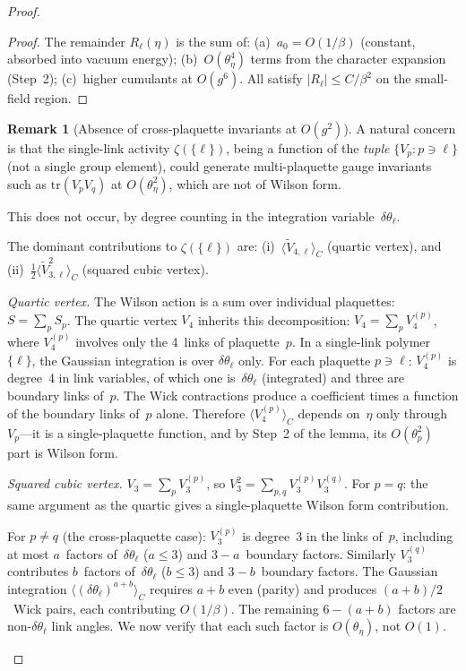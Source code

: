 \documentclass[11pt]{article}
\theoremstyle{definition}
\newtheorem{remark}[theorem]{Remark}
\newcommand{\tr}{\mathrm{tr}}
\begin{document}
\begin{proof}
\begin{proof}
The remainder $R_\ell(\eta)$ is the sum of:
(a)~$a_0=O(1/\beta)$ (constant, absorbed into vacuum energy);
(b)~$O(\theta_\eta^4)$ terms from the character expansion
(Step~2); (c)~higher cumulants at $O(g^6)$.  All satisfy
$|R_\ell|\le C/\beta^2$ on the small-field region.
\end{proof}

\begin{remark}[Absence of cross-plaquette invariants at $O(g^2)$]
\label{rem:cross-plaquette}
A natural concern is that the single-link activity
$\zeta(\{\ell\})$, being a function of the \emph{tuple}
$\{V_p:p\ni\ell\}$ (not a single group element), could
generate multi-plaquette gauge invariants such as
$\tr(V_p V_q)$ at $O(\theta_\eta^2)$, which are not of
Wilson form.

This does not occur, by degree counting in the
integration variable~$\delta\theta_\ell$.

The dominant contributions to $\zeta(\{\ell\})$ are:
(i)~$\langle\widetilde{V}_{4,\ell}\rangle_C$ (quartic
vertex), and
(ii)~$\frac{1}{2}\langle\widetilde{V}_{3,\ell}^2\rangle_C$
(squared cubic vertex).

\emph{Quartic vertex.}
The Wilson action is a sum over individual plaquettes:
$S=\sum_p S_p$.  The quartic vertex $V_4$ inherits this
decomposition: $V_4=\sum_p V_4^{(p)}$, where $V_4^{(p)}$
involves only the 4~links of plaquette~$p$.  In a
single-link polymer $\{\ell\}$, the Gaussian integration
is over $\delta\theta_\ell$ only.  For each plaquette
$p\ni\ell$: $V_4^{(p)}$ is degree~4 in link variables,
of which one is~$\delta\theta_\ell$ (integrated) and
three are boundary links of~$p$.  The Wick contractions
produce a coefficient times a function of the boundary
links of~$p$ alone.  Therefore
$\langle V_4^{(p)}\rangle_C$ depends on~$\eta$ only
through $V_p$---it is a single-plaquette function, and
by Step~2 of the lemma, its $O(\theta_p^2)$ part is
Wilson form.

\emph{Squared cubic vertex.}
$V_3=\sum_p V_3^{(p)}$, so
$V_3^2=\sum_{p,q}V_3^{(p)}V_3^{(q)}$.  For $p=q$:
the same argument as the quartic gives a single-plaquette
Wilson form contribution.

For $p\ne q$ (the cross-plaquette case):
$V_3^{(p)}$ is degree~3 in the links of~$p$, including
at most $a$~factors of~$\delta\theta_\ell$ ($a\le 3$)
and $3-a$~boundary factors.  Similarly $V_3^{(q)}$
contributes $b$~factors of~$\delta\theta_\ell$ ($b\le 3$)
and $3-b$~boundary factors.  The Gaussian integration
$\langle(\delta\theta_\ell)^{a+b}\rangle_C$ requires
$a+b$ even (parity) and produces $(a+b)/2$~Wick pairs,
each contributing $O(1/\beta)$.  The remaining
$6-(a+b)$ factors are non-$\delta\theta_\ell$ link angles.
We now verify that each such factor is $O(\theta_\eta)$,
not $O(1)$.


\end{remark}
\end{proof}
\end{document}
